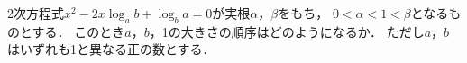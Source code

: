 \documentclass[../../main.tex]{subfiles}
\begin{document}
2次方程式$x^2-2x\log_ab+\log_ba=0$が実根$\alpha$，$\beta$をもち，
$0<\alpha<1<\beta$となるものとする．
このとき$a$，$b$，1の大きさの順序はどのようになるか．
ただし$a$，$b$はいずれも1と異なる正の数とする．
\end{document}

